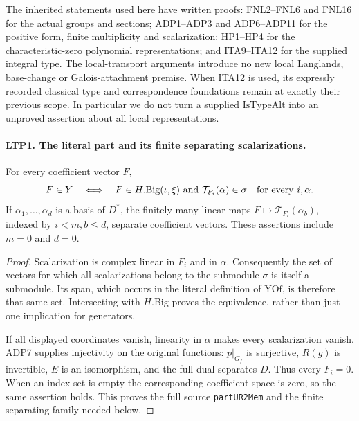 \documentclass[11pt,a4paper]{article}
\numberwithin{equation}{section}
\theoremstyle{remark}\newtheorem{remark}[theorem]{Remark}
\begin{document}
The inherited statements used here have written proofs: FNL2--FNL6
and FNL16 for the actual groups and sections; ADP1--ADP3 and
ADP6--ADP11 for the positive form, finite multiplicity and
scalarization; HP1--HP4 for the characteristic-zero polynomial
representations; and ITA9--ITA12 for the supplied integral type.
The local-transport arguments introduce no new local Langlands,
base-change or Galois-attachment premise.  When ITA12 is used, its
expressly recorded classical type and correspondence foundations
remain at exactly their previous scope.  In particular we do not
turn a supplied \(\mathrm{IsTypeAlt}\) into an unproved assertion
about all local representations.

\paragraph{LTP1. The literal part and its finite separating scalarizations.}
\label{claim:LTP1}
For every coefficient vector \(F\),
\[
 F\in Y
 \quad\Longleftrightarrow\quad
 F\in H.\mathrm{Big}(\iota,\xi)
       \ \hbox{and}\ 
 \mathcal T_{F_i}(\alpha)\in\sigma
                  \quad\hbox{for every }i,\alpha .
\]
If \(\alpha_1,\ldots,\alpha_d\) is a basis of \(D^*\), the finitely
many linear maps
\(F\mapsto\mathcal T_{F_i}(\alpha_b)\), indexed by \(i<m,b\le d\),
separate coefficient vectors.  These assertions include \(m=0\)
and \(d=0\).
\begin{proof}
Scalarization is complex linear in \(F_i\) and in \(\alpha\).
Consequently the set of vectors for which all scalarizations belong
to the submodule \(\sigma\) is itself a submodule.  Its span, which
occurs in the literal definition of \(\mathrm{YOf}\), is therefore
that same set.  Intersecting with \(H.\mathrm{Big}\) proves the
equivalence, rather than just one implication for generators.

If all displayed coordinates vanish, linearity in \(\alpha\) makes
every scalarization vanish.  ADP7 supplies injectivity on the original
functions: \(p|_{G_f}\) is surjective, \(R(g)\) is invertible, \(E\)
is an isomorphism, and the full dual separates \(D\).  Thus every
\(F_i=0\).  When an index set is empty the corresponding coefficient
space is zero, so the same assertion holds.  This proves the full
source \texttt{part\allowbreak UR2Mem} and the finite separating family needed
below.
\end{proof}

\end{document}
